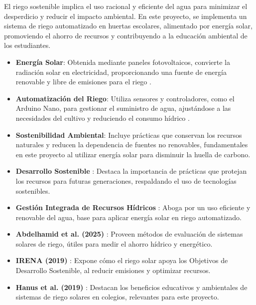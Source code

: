 \documentclass[12pt]{article}
\begin{document}
El riego sostenible implica el uso racional y eficiente del agua para minimizar el desperdicio y reducir el impacto ambiental. En este proyecto, se implementa un sistema de riego automatizado en huertas escolares, alimentado por energía solar, promoviendo el ahorro de recursos y contribuyendo a la educación ambiental de los estudiantes.

\begin{itemize}
      \item \textbf{Energía Solar}: Obtenida mediante paneles fotovoltaicos, convierte la radiación solar en electricidad, proporcionando una fuente de energía renovable y libre de emisiones para el riego \cite{Repsol2024}.
      \item \textbf{Automatización del Riego}: Utiliza sensores y controladores, como el Arduino Nano, para gestionar el suministro de agua, ajustándose a las necesidades del cultivo y reduciendo el consumo hídrico \cite{MaherElectronica2021}.
      \item \textbf{Sostenibilidad Ambiental}: Incluye prácticas que conservan los recursos naturales y reducen la dependencia de fuentes no renovables, fundamentales en este proyecto al utilizar energía solar para disminuir la huella de carbono.
\end{itemize}

\begin{itemize}
      \item \textbf{Desarrollo Sostenible} \cite{Brundtland1987}: Destaca la importancia de prácticas que protejan los recursos para futuras generaciones, respaldando el uso de tecnologías sostenibles.
      \item \textbf{Gestión Integrada de Recursos Hídricos} \cite{GWP2000}: Aboga por un uso eficiente y renovable del agua, base para aplicar energía solar en riego automatizado.
      \item \textbf{Abdelhamid et al. (2025)} \cite{Abdelhamid2025}: Proveen métodos de evaluación de sistemas solares de riego, útiles para medir el ahorro hídrico y energético.
      \item \textbf{IRENA (2019)} \cite{IRENA2019}: Expone cómo el riego solar apoya los Objetivos de Desarrollo Sostenible, al reducir emisiones y optimizar recursos.
      \item \textbf{Hanus et al. (2019)} \cite{Hanus2019}: Destacan los beneficios educativos y ambientales de sistemas de riego solares en colegios, relevantes para este proyecto.
\end{itemize}
\end{document}
